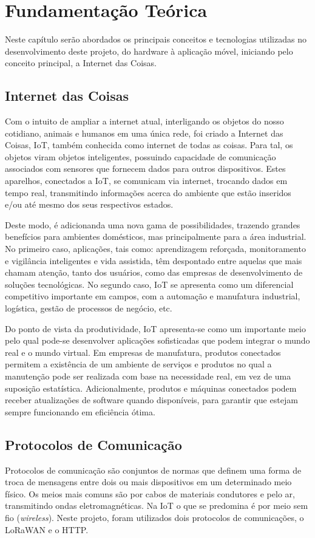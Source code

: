 \chapter{Fundamentação Teórica}
\label{cap:fundamentacao}
Neste capítulo serão abordados os principais conceitos e tecnologias utilizadas no desenvolvimento deste projeto, do hardware à aplicação móvel, iniciando pelo conceito principal, a Internet das Coisas.

\section{Internet das Coisas}
\label{fund:iot}
Com o intuito de ampliar a internet atual, interligando os objetos do nosso cotidiano, animais e humanos em uma única rede, foi criado a Internet das Coisas, IoT, também conhecida como internet de todas as coisas. Para tal, os objetos viram objetos inteligentes, possuindo capacidade de comunicação associados com sensores que fornecem dados para outros dispositivos. Estes aparelhos, conectados a IoT, se comunicam via internet, trocando dados em tempo real, transmitindo informações acerca do ambiente que estão inseridos e/ou até mesmo dos seus respectivos estados. 

Deste modo, é adicionanda uma nova gama de possibilidades, trazendo grandes benefícios para ambientes domésticos, mas principalmente para a área industrial. No primeiro caso, aplicações, tais como: aprendizagem reforçada, monitoramento e vigilância inteligentes e vida assistida, têm despontado entre aquelas que mais chamam atenção, tanto dos usuários, como das empresas de desenvolvimento de soluções tecnológicas. No segundo caso, IoT se apresenta como um diferencial competitivo importante em campos, com a automação e manufatura industrial, logística, gestão de processos de negócio, etc.

Do ponto de vista da produtividade, IoT apresenta-se como um importante meio pelo qual pode-se desenvolver aplicações sofisticadas que podem integrar o mundo real e o mundo virtual. Em empresas de manufatura, produtos conectados permitem a existência de um ambiente de serviços e produtos no qual a manutenção pode ser realizada com base na necessidade real, em vez de uma suposição estatística. Adicionalmente, produtos e máquinas conectados podem receber atualizações de software quando disponíveis, para garantir que estejam sempre funcionando em eficiência ótima.

\section{Protocolos de Comunicação}
\label{fund:protocolos}
Protocolos de comunicação são conjuntos de normas que definem uma forma de troca de mensagens entre dois ou mais dispositivos em um determinado meio físico. Os meios mais comuns são por cabos de materiais condutores e pelo ar, transmitindo ondas eletromagnéticas. Na IoT o que se predomina é por meio sem fio (\textit{wireless}). Neste projeto, foram utilizados dois protocolos de comunicações, o LoRaWAN e o HTTP.

